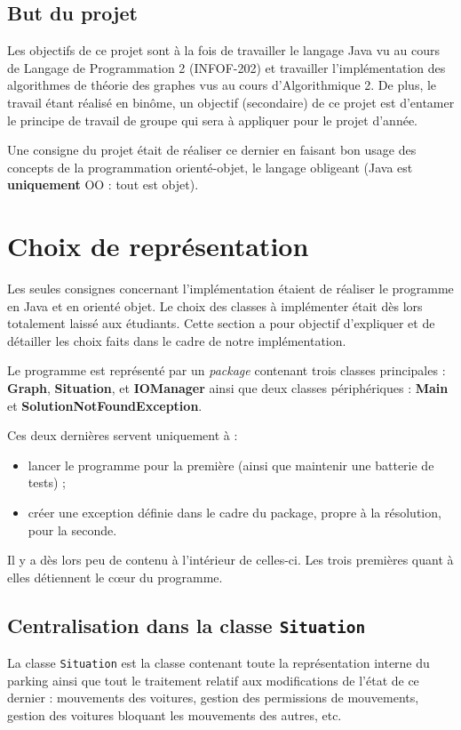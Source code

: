 \documentclass{article}
\begin{document}
	\subsection{But du projet}
		Les objectifs de ce projet sont à la fois de travailler le langage Java vu au cours de Langage de Programmation 2 (INFOF-202) et
		travailler l'implémentation des algorithmes de théorie des graphes vus au cours d'Algorithmique 2. De plus, le travail étant réalisé en binôme,
		un objectif (secondaire) de ce projet est d'entamer le principe de travail de groupe qui sera à appliquer pour le projet d'année.

		Une consigne du projet était de réaliser ce dernier en faisant bon usage des concepts de la programmation orienté-objet, le langage
		obligeant (Java est \textbf{uniquement} OO : tout est objet).

\section{Choix de représentation}
	Les seules consignes concernant l'implémentation étaient de réaliser le programme en Java et en orienté objet. Le choix des classes à implémenter était
	dès lors totalement laissé aux étudiants. Cette section a pour objectif d'expliquer et de détailler les choix faits dans le cadre de notre implémentation.

	Le programme est représenté par un \textit{package} contenant trois classes principales : \textbf{Graph}, \textbf{Situation}, et \textbf{IOManager}
	ainsi que deux classes périphériques : \textbf{Main} et \textbf{SolutionNotFoundException}.

	Ces deux dernières servent uniquement à :
	
	\begin{itemize}
		\item lancer le programme pour la première (ainsi que maintenir une batterie de tests) ;
		\item créer une exception définie dans le cadre du package, propre à la résolution, pour la seconde.
	\end{itemize}
	
	Il y a dès lors peu de contenu à l'intérieur de celles-ci. Les trois premières quant à elles détiennent le cœur du programme.

	\subsection{Centralisation dans la classe \texttt{Situation}}
		La classe \texttt{Situation} est la classe contenant toute la représentation interne du parking ainsi que tout le traitement relatif aux
		modifications de l'état de ce dernier : mouvements des voitures, gestion des permissions de mouvements, gestion des voitures bloquant
		les mouvements des autres, etc.
\end{document}
